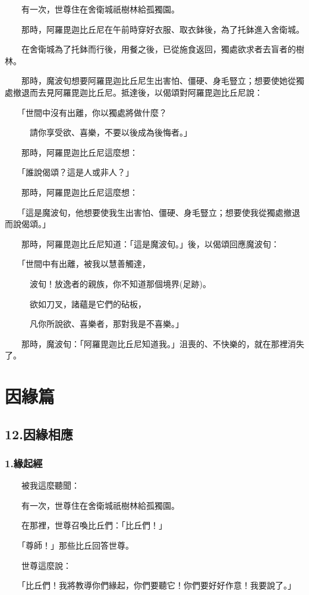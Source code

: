 \documentclass[12pt,oneside]{book}
\begin{document}
　　有一次，世尊住在舍衛城祇樹林給孤獨園。

　　那時，阿羅毘迦比丘尼在午前時穿好衣服、取衣鉢後，為了托鉢進入舍衛城。

　　在舍衛城為了托鉢而行後，用餐之後，已從施食返回，獨處欲求者去盲者的樹林。

　　那時，魔波旬想要阿羅毘迦比丘尼生出害怕、僵硬、身毛豎立；想要使她從獨處撤退而去見阿羅毘迦比丘尼。抵達後，以偈頌對阿羅毘迦比丘尼說：

　　「世間中沒有出離，你以獨處將做什麼？

　　　請你享受欲、喜樂，不要以後成為後悔者。」

　　那時，阿羅毘迦比丘尼這麼想：

　　「誰說偈頌？這是人或非人？」

　　那時，阿羅毘迦比丘尼這麼想：

　　「這是魔波旬，他想要使我生出害怕、僵硬、身毛豎立；想要使我從獨處撤退而說偈頌。」

　　那時，阿羅毘迦比丘尼知道：「這是魔波旬。」後，以偈頌回應魔波旬：

　　「世間中有出離，被我以慧善觸達，

　　　波旬！放逸者的親族，你不知道那個境界(足跡)。

　　　欲如刀叉，諸蘊是它們的砧板，

　　　凡你所說欲、喜樂者，那對我是不喜樂。」

　　那時，魔波旬：「阿羅毘迦比丘尼知道我。」沮喪的、不快樂的，就在那裡消失了。

\part{因緣篇}
\chapter{12.因緣相應}
\section{1.緣起經}

　　被我這麼聽聞：

　　有一次，世尊住在舍衛城祇樹林給孤獨園。

　　在那裡，世尊召喚比丘們：「比丘們！」

　　「尊師！」那些比丘回答世尊。

　　世尊這麼說：

　　「比丘們！我將教導你們緣起，你們要聽它！你們要好好作意！我要說了。」
\end{document}
